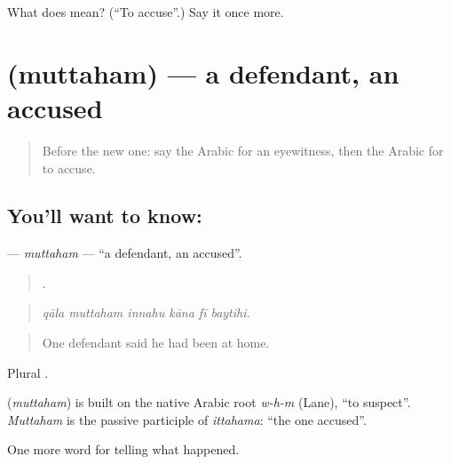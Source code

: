 \begin{tcolorbox}[breakable,colback=teal!4,colframe=teal!35!black,title={Before you move on}]
What does  mean? (\textquotedblleft{}To accuse\textquotedblright{}.) Say it once more.
\end{tcolorbox}
\section[\texorpdfstring{\ar{متهم} (muttaham)}{متهم (muttaham)}]{ (muttaham) — a defendant, an accused}

\label{lesson:AR-C305-muttaham}



\begin{quote}
Before the new one: say the Arabic for an eyewitness, then the Arabic for to accuse.
\end{quote}

\subsection*{You'll want to know: }
\textbf{} — \emph{muttaham} — \textquotedblleft{}a defendant, an accused\textquotedblright{}.

\begin{quote}
     .
\end{quote}

\begin{quote}
\emph{qāla muttaham innahu kāna fī baytihi.}
\end{quote}

\begin{quote}
One defendant said he had been at home.
\end{quote}

Plural .

\begin{cousinweb}
\textbf{} (\emph{muttaham}) is built on the native Arabic root \emph{w-h-m} (Lane), \textquotedblleft{}to suspect\textquotedblright{}. \emph{Muttaham} is the passive participle of \emph{ittahama}: \textquotedblleft{}the one accused\textquotedblright{}.
\end{cousinweb}

\begin{grammarlens}[title={What you've built}]
One more word for telling what happened.
\end{grammarlens}

